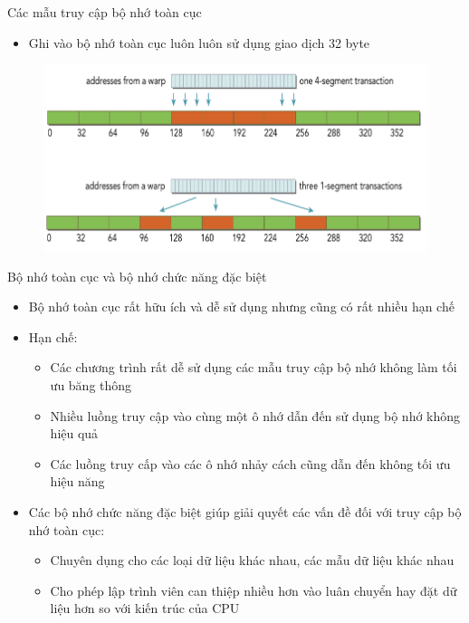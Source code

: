 \documentclass[10pt]{beamer}
\theoremstyle{remark}
\numberwithin{algocf}{section}
\numberwithin{equation}{section}
\numberwithin{dl}{section}
\numberwithin{figure}{section}
\begin{document}
\begin{frame}{Các mẫu truy cập bộ nhớ toàn cục}
    \begin{itemize}
        \item Ghi vào bộ nhớ toàn cục luôn luôn sử dụng giao dịch 32 byte
    \end{itemize}
    \begin{figure}[H]
        \centering
        \includegraphics[width=0.7\linewidth]{figures/CUDA/Global_Memory_Write.png}
    \end{figure}
\end{frame}

\begin{frame}{Bộ nhớ toàn cục và bộ nhớ chức năng đặc biệt}
    \begin{itemize}
        \item Bộ nhớ toàn cục rất hữu ích và dễ sử dụng nhưng cũng có rất nhiều hạn chế
        \item Hạn chế:
        \begin{itemize}
            \item Các chương trình rất dễ sử dụng các mẫu truy cập bộ nhớ không làm tối ưu băng thông
            \item Nhiều luồng truy cập vào cùng một ô nhớ dẫn đến sử dụng bộ nhớ không hiệu quả
            \item Các luồng truy cấp vào các ô nhớ nhảy cách cũng dẫn đến không tối ưu hiệu năng
        \end{itemize}
        \item Các bộ nhớ chức năng đặc biệt giúp giải quyết các vấn đề đối với truy cập bộ nhớ toàn cục:
        \begin{itemize}
            \item Chuyên dụng cho các loại dữ liệu khác nhau, các mẫu dữ liệu khác nhau
            \item Cho phép lập trình viên can thiệp nhiều hơn vào luân chuyển hay đặt dữ liệu hơn so với kiến trúc của CPU
        \end{itemize}
    \end{itemize}
\end{frame}
\end{document}

